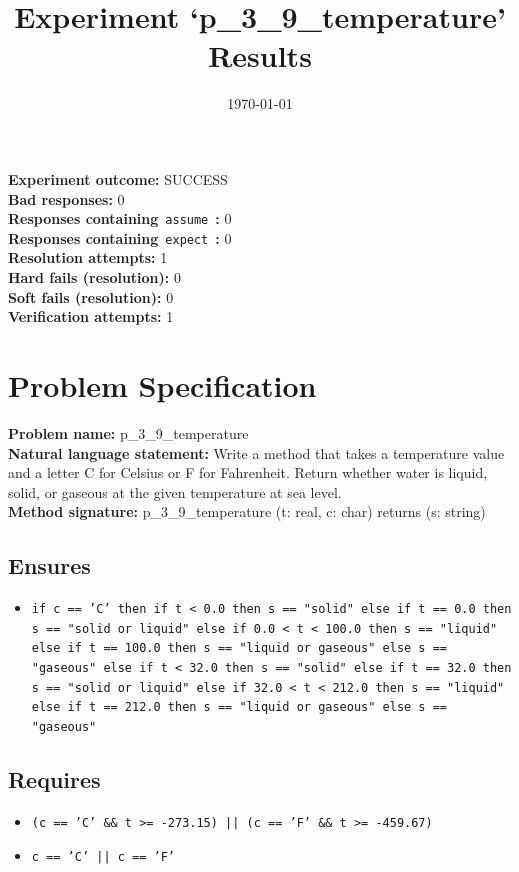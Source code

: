 \documentclass{article}
\begin{document}
\title{Experiment `p\_3\_9\_temperature' Results}
\author{\today}
\date{}
\maketitle
\textbf{Experiment outcome: }SUCCESS
\\\textbf{Bad responses: }0
\\\textbf{Responses containing}~\texttt{assume}~\textbf{: }0
\\\textbf{Responses containing}~\texttt{expect}~\textbf{: }0
\\\textbf{Resolution attempts: }1
\\\textbf{Hard fails (resolution): }0
\\\textbf{Soft fails (resolution): }0
\\\textbf{Verification attempts: }1
\section*{Problem Specification}
\textbf{Problem name: }p\_3\_9\_temperature
\\\textbf{Natural language statement: }Write a method that takes a temperature value and a letter C for Celsius or F for Fahrenheit. Return whether water is liquid, solid, or gaseous at the given temperature at sea level.
\\\textbf{Method signature: }p\_3\_9\_temperature (t: real, c: char) returns (s: string)
\subsection*{Ensures}
\begin{itemize}
\item \texttt{if c == 'C' then if t < 0.0 then s == "solid" else if t == 0.0 then s == "solid or liquid" else if 0.0 < t < 100.0 then s == "liquid" else if t == 100.0 then s == "liquid or gaseous" else s == "gaseous" else if t < 32.0 then s == "solid" else if t == 32.0 then s == "solid or liquid" else if 32.0 < t < 212.0 then s == "liquid" else if t == 212.0 then s == "liquid or gaseous" else s == "gaseous"}
\end{itemize}
\subsection*{Requires}
\begin{itemize}
\item \texttt{(c == 'C' \&\& t >= -273.15) || (c == 'F' \&\& t >= -459.67)}
\item \texttt{c == 'C' || c == 'F'}
\end{itemize}
\clearpage
\end{document}
